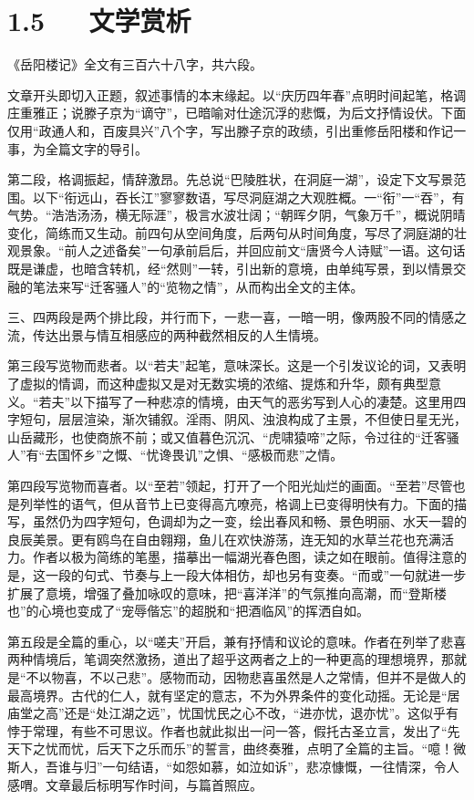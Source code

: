 \documentclass[letterpaper,10pt,english]{sphinxmanual}
\begin{document}
\section{1.5   文学赏析}
\label{\detokenize{p01_u6563_u6587/_u8303_u4ef2_u6df9-_u5cb3_u9633_u697c_u8bb0:id7}}
《岳阳楼记》全文有三百六十八字，共六段。

文章开头即切入正题，叙述事情的本末缘起。以“庆历四年春”点明时间起笔，格调庄重雅正；说滕子京为“谪守”，已暗喻对仕途沉浮的悲慨，为后文抒情设伏。下面仅用“政通人和，百废具兴”八个字，写出滕子京的政绩，引出重修岳阳楼和作记一事，为全篇文字的导引。

第二段，格调振起，情辞激昂。先总说“巴陵胜状，在洞庭一湖”，设定下文写景范围。以下“衔远山，吞长江”寥寥数语，写尽洞庭湖之大观胜概。一“衔”一“吞”，有气势。“浩浩汤汤，横无际涯”，极言水波壮阔；“朝晖夕阴，气象万千”，概说阴晴变化，简练而又生动。前四句从空间角度，后两句从时间角度，写尽了洞庭湖的壮观景象。“前人之述备矣”一句承前启后，并回应前文“唐贤今人诗赋”一语。这句话既是谦虚，也暗含转机，经“然则”一转，引出新的意境，由单纯写景，到以情景交融的笔法来写“迁客骚人”的“览物之情”，从而构出全文的主体。

三、四两段是两个排比段，并行而下，一悲一喜，一暗一明，像两股不同的情感之流，传达出景与情互相感应的两种截然相反的人生情境。

第三段写览物而悲者。以“若夫”起笔，意味深长。这是一个引发议论的词，又表明了虚拟的情调，而这种虚拟又是对无数实境的浓缩、提炼和升华，颇有典型意义。“若夫”以下描写了一种悲凉的情境，由天气的恶劣写到人心的凄楚。这里用四字短句，层层渲染，渐次铺叙。淫雨、阴风、浊浪构成了主景，不但使日星无光，山岳藏形，也使商旅不前；或又值暮色沉沉、“虎啸猿啼”之际，令过往的“迁客骚人”有“去国怀乡”之慨、“忧谗畏讥”之惧、“感极而悲”之情。

第四段写览物而喜者。以“至若”领起，打开了一个阳光灿烂的画面。“至若”尽管也是列举性的语气，但从音节上已变得高亢嘹亮，格调上已变得明快有力。下面的描写，虽然仍为四字短句，色调却为之一变，绘出春风和畅、景色明丽、水天一碧的良辰美景。更有鸥鸟在自由翱翔，鱼儿在欢快游荡，连无知的水草兰花也充满活力。作者以极为简练的笔墨，描摹出一幅湖光春色图，读之如在眼前。值得注意的是，这一段的句式、节奏与上一段大体相仿，却也另有变奏。“而或”一句就进一步扩展了意境，增强了叠加咏叹的意味，把“喜洋洋”的气氛推向高潮，而“登斯楼也”的心境也变成了“宠辱偕忘”的超脱和“把酒临风”的挥洒自如。

第五段是全篇的重心，以“嗟夫”开启，兼有抒情和议论的意味。作者在列举了悲喜两种情境后，笔调突然激扬，道出了超乎这两者之上的一种更高的理想境界，那就是“不以物喜，不以己悲”。感物而动，因物悲喜虽然是人之常情，但并不是做人的最高境界。古代的仁人，就有坚定的意志，不为外界条件的变化动摇。无论是“居庙堂之高”还是“处江湖之远”，忧国忧民之心不改，“进亦忧，退亦忧”。这似乎有悖于常理，有些不可思议。作者也就此拟出一问一答，假托古圣立言，发出了“先天下之忧而忧，后天下之乐而乐”的誓言，曲终奏雅，点明了全篇的主旨。“噫！微斯人，吾谁与归”一句结语，“如怨如慕，如泣如诉”，悲凉慷慨，一往情深，令人感喟。文章最后标明写作时间，与篇首照应。
\end{document}
